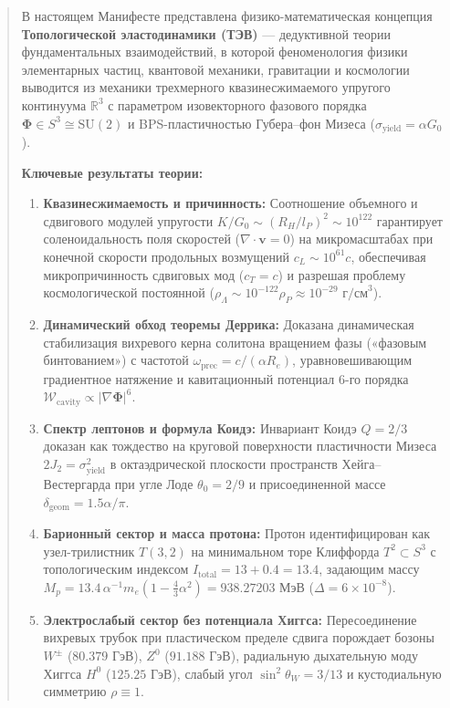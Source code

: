\documentclass[12pt,a4paper]{article}
\theoremstyle{definition}
\theoremstyle{remark}
\begin{document}
	\begin{abstract}
		\noindent В настоящем Манифесте представлена физико-математическая концепция \textbf{Топологической эластодинамики (ТЭВ)} --- дедуктивной теории фундаментальных взаимодействий, в которой феноменология физики элементарных частиц, квантовой механики, гравитации и космологии выводится из механики трехмерного квазинесжимаемого упругого континуума $\mathbb{R}^3$ с параметром изовекторного фазового порядка $\boldsymbol{\Phi} \in S^3 \cong \mathrm{SU}(2)$ и BPS-пластичностью Губера--фон Мизеса ($\sigma_{\mathrm{yield}} = \alpha G_0$). 
		
		\vspace{2mm}
		\noindent \textbf{Ключевые результаты теории:}
		\begin{enumerate}
		\item \textbf{Квазинесжимаемость и причинность:} Соотношение объемного и сдвигового модулей упругости $K/G_0 \sim (R_H/l_P)^2 \sim 10^{122}$ гарантирует соленоидальность поля скоростей ($\nabla \cdot \mathbf{v} = 0$) на микромасштабах при конечной скорости продольных возмущений $c_L \sim 10^{61}c$, обеспечивая микропричинность сдвиговых мод ($c_T = c$) и разрешая проблему космологической постоянной ($\rho_\Lambda \sim 10^{-122} \rho_P \approx 10^{-29}\text{ г/см}^3$).
		\item \textbf{Динамический обход теоремы Деррика:} Доказана динамическая стабилизация вихревого керна солитона вращением фазы («фазовым бинтованием») с частотой $\omega_{\mathrm{prec}} = c/(\alpha R_e)$, уравновешивающим градиентное натяжение и кавитационный потенциал 6-го порядка $\mathcal{W}_{\mathrm{cavity}} \propto |\nabla \boldsymbol{\Phi}|^6$.
		\item \textbf{Спектр лептонов и формула Коидэ:} Инвариант Коидэ $Q = 2/3$ доказан как тождество на круговой поверхности пластичности Мизеса $2J_2 = \sigma_{\mathrm{yield}}^2$ в октаэдрической плоскости пространств Хейга--Вестергарда при угле Лоде $\theta_0 = 2/9$ и присоединенной массе $\delta_{\mathrm{geom}} = 1.5\alpha/\pi$.
		\item \textbf{Барионный сектор и масса протона:} Протон идентифицирован как узел-трилистник $T(3,2)$ на минимальном торе Клиффорда $T^2 \subset S^3$ с топологическим индексом $I_{\mathrm{total}} = 13 + 0.4 = 13.4$, задающим массу $M_p = 13.4 \, \alpha^{-1} m_e (1 - \frac{4}{3}\alpha^2) = 938.27203$ МэВ ($\Delta = 6 \times 10^{-8}$).
		\item \textbf{Электрослабый сектор без потенциала Хиггса:} Пересоединение вихревых трубок при пластическом пределе сдвига порождает бозоны $W^\pm$ ($80.379$ ГэВ), $Z^0$ ($91.188$ ГэВ), радиальную дыхательную моду Хиггса $H^0$ ($125.25$ ГэВ), слабый угол $\sin^2\theta_W = 3/13$ и кустодиальную симметрию $\rho \equiv 1$.

\end{enumerate}
\end{abstract}
\end{document}
